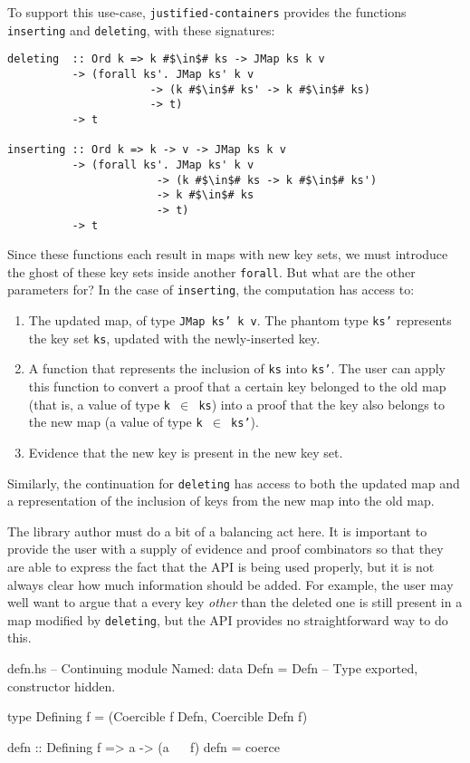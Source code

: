 \documentclass[format=sigplan, review=false, screen=true]{acmart}
\begin{document}
To support this use-case, \texttt{justified-containers} provides the functions
\texttt{inserting} and \texttt{deleting}, with these signatures:
\begin{verbatim}
deleting  :: Ord k => k #$\in$# ks -> JMap ks k v
          -> (forall ks'. JMap ks' k v
                      -> (k #$\in$# ks' -> k #$\in$# ks)
                      -> t)
          -> t

inserting :: Ord k => k -> v -> JMap ks k v
          -> (forall ks'. JMap ks' k v
                       -> (k #$\in$# ks -> k #$\in$# ks')
                       -> k #$\in$# ks
                       -> t)
          -> t
\end{verbatim}
Since these functions each result in maps with new key sets, we must
introduce the ghost of these key sets inside another \texttt{forall}.
But what are the other parameters for? In the case of \texttt{inserting},
the computation has access to:
\begin{enumerate}
\item The updated map, of type \texttt{JMap ks' k v}. The phantom type \texttt{ks'}
  represents the key set \texttt{ks}, updated with the newly-inserted key.
\item A function that represents the inclusion of \texttt{ks} into \texttt{ks'}.
  The user can apply this function to convert a proof that a certain key belonged to the
  old map (that is, a value of type \texttt{k $\in$ ks}) into a proof that the key also belongs to the new map (a value of type \texttt{k $\in$ ks'}).
\item Evidence that the new key is present in the new key set.
\end{enumerate}

Similarly, the continuation for \texttt{deleting} has access to both the updated map
and a representation of the inclusion of keys from the new map into the old map.

The library author must do a bit of a balancing act here. It is important to provide
the user with a supply of evidence and proof combinators so that they are able to
express the fact that the API is being used properly, but it is not always clear how
much information should be added. For example, the user may well want to argue that a
every key \emph{other} than the deleted one is still present in a map modified by
\texttt{deleting}, but the API provides no straightforward way to do this.

\begin{filecontents*}{defn.hs}
-- Continuing module Named:
data Defn = Defn -- Type exported, constructor hidden.

type Defining f = (Coercible f Defn, Coercible Defn f)

defn :: Defining f => a -> (a ~~ f)
defn = coerce
\end{filecontents*}
\end{document}
